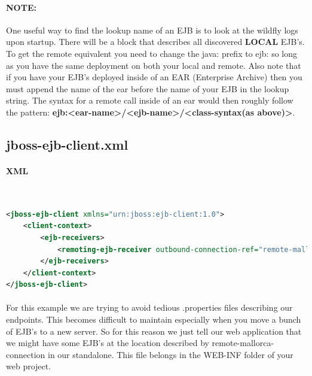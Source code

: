 \documentclass[
10pt, %
letterpaper, %
oneside, %
headinclude,footinclude, %
BCOR5mm, %
]{scrartcl}
\begin{document}
\paragraph{\textbf{NOTE:}} One useful way to find the lookup name of an EJB is to look at the wildfly logs upon startup. There will be a block that describes all discovered \textbf{LOCAL} EJB's. To get the remote equivalent you need to change the java: prefix to ejb: so long as you have the same deployment on both your local and remote. Also note that if you have your EJB's deployed inside of an EAR (Enterprise Archive) then you must append the name of the ear before the name of your EJB in the lookup string. The syntax for a remote call inside of an ear would then roughly follow the pattern: \textbf{ejb:<ear-name>/<ejb-name>/<class-syntax(as above)>}.


\subsection{jboss-ejb-client.xml}


\paragraph{XML}~
\begin{lstlisting}[language=XML]
<jboss-ejb-client xmlns="urn:jboss:ejb-client:1.0">
	<client-context>
		<ejb-receivers>
			<remoting-ejb-receiver outbound-connection-ref="remote-mallorca-connection"/>
		</ejb-receivers>
	</client-context>
</jboss-ejb-client>
\end{lstlisting}

\paragraph{} For this example we are trying to avoid tedious .properties files describing our endpoints. This becomes difficult to maintain especially when you move a bunch of EJB's to a new server. So for this reason we just tell our web application that we might have some EJB's at the location described by remote-mallorca-connection in our standalone. This file belongs in the WEB-INF folder of your web project.


\end{document}
